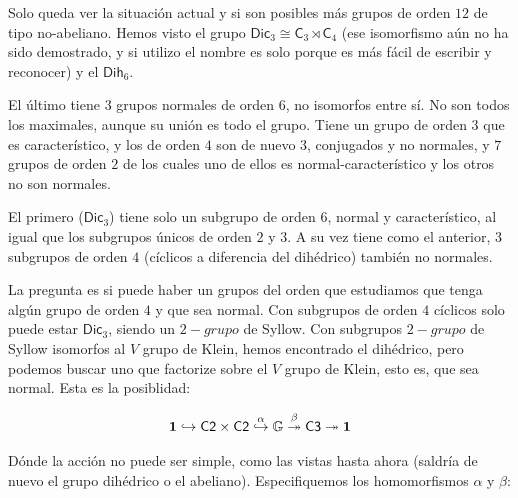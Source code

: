 \documentclass[12pt,a4paper,fleqn,spanish,final,openright]{extbook}
\theoremstyle{definition}
\theoremstyle{remark}
\begin{document}
Solo queda ver la situación actual y si son posibles más grupos de orden $12$ de tipo no-abeliano.
Hemos visto el grupo $\mathsf{Dic}_{3} \cong \mathsf{C}_{3}\rtimes\mathsf{C}_{4}$ (ese isomorfismo aún
no ha sido demostrado, y si utilizo el nombre es solo porque es más fácil de escribir y reconocer) y
el $\mathsf{Dih}_{6}$.

El último tiene $3$ grupos normales de orden $6$, no isomorfos entre sí. No son todos los maximales,
aunque su unión es todo el grupo. Tiene un grupo de orden $3$ que es característico, y los de orden
$4$ son de nuevo $3$, conjugados y no normales, y $7$ grupos de orden $2$ de los cuales uno de ellos
es normal-característico y los otros no son normales.

El primero ($\mathsf{Dic}_{3}$) tiene solo un subgrupo de orden $6$, normal y característico, al
igual que los subgrupos únicos de orden $2$ y $3$. A su vez tiene como el anterior, $3$ subgrupos de
orden $4$ (cíclicos a diferencia del dihédrico) también no normales.

La pregunta es si puede haber un grupos del orden que estudiamos que tenga algún grupo de orden $4$ y
que sea normal. Con subgrupos de orden $4$ cíclicos solo puede estar $\mathsf{Dic}_{3}$, siendo un
$2-grupo$ de Syllow. Con subgrupos $2-grupo$ de Syllow isomorfos al $V$ grupo de Klein, hemos
encontrado el dihédrico, pero podemos buscar uno que factorize sobre el $V$ grupo de Klein, esto es,
que sea normal. Esta es la posiblidad:

\begin{align*}
\bold{1}  \hookrightarrow  \mathsf{C2} \times \mathsf{C2} \overset{\alpha }{ \hookrightarrow } \mathbb{G} \overset{\beta }\twoheadrightarrow \mathsf{C3} \twoheadrightarrow \bold{1}
\end{align*}

Dónde la acción no puede ser simple, como las vistas hasta ahora (saldría de nuevo el grupo dihédrico o el abeliano). Especifiquemos los homomorfismos $\alpha$ y $\beta$:
\end{document}
